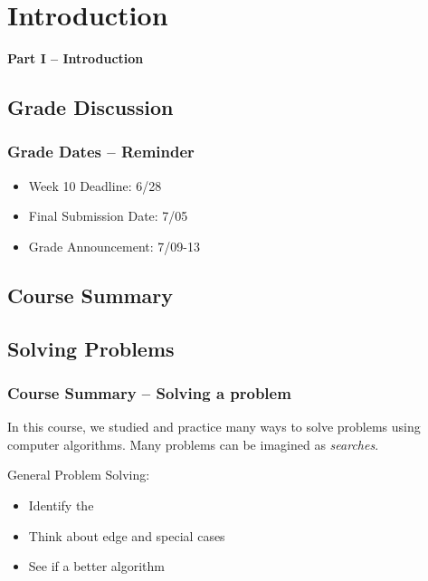 \section{Introduction}

\begin{frame}{}

  {\bf Part I -- Introduction}
\end{frame}

\subsection{Grade Discussion}

\begin{frame}
  \frametitle{Grade Dates -- Reminder}

  \begin{itemize}
  \item Week 10 Deadline: 6/28
    \bigskip

  \item Final Submission Date: 7/05
    \bigskip

  \item Grade Announcement: 7/09-13
  \end{itemize}
\end{frame}

\subsection{Course Summary}

\subsection{Solving Problems}
\begin{frame}
  \frametitle{Course Summary -- Solving a problem}

  \begin{block}{}
    In this course, we studied and practice many ways
    to solve problems using computer algorithms. Many
    problems can be imagined as \emph{searches}.
  \end{block}

  \vfill

  General Problem Solving:
  \begin{itemize}
  \item Identify the 
  \item Think about edge and special cases
  \item See if a better algorithm 
  \end{itemize}

\end{frame}

